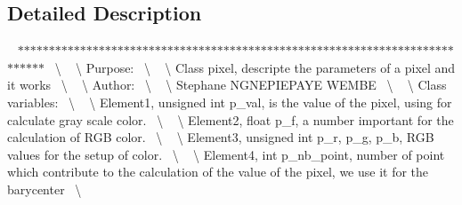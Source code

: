 \subsection{Detailed Description}
~\newline
$\ast$$\ast$$\ast$$\ast$$\ast$$\ast$$\ast$$\ast$$\ast$$\ast$$\ast$$\ast$$\ast$$\ast$$\ast$$\ast$$\ast$$\ast$$\ast$$\ast$$\ast$$\ast$$\ast$$\ast$$\ast$$\ast$$\ast$$\ast$$\ast$$\ast$$\ast$$\ast$$\ast$$\ast$$\ast$$\ast$$\ast$$\ast$$\ast$$\ast$$\ast$$\ast$$\ast$$\ast$$\ast$$\ast$$\ast$$\ast$$\ast$$\ast$$\ast$$\ast$$\ast$$\ast$$\ast$$\ast$$\ast$$\ast$$\ast$$\ast$$\ast$$\ast$$\ast$$\ast$$\ast$$\ast$$\ast$$\ast$$\ast$$\ast$$\ast$$\ast$$\ast$$\ast$$\ast$$\ast$~\newline
\textbackslash{} ~\newline
\textbackslash{} Purpose\+:~\newline
\textbackslash{} ~\newline
\textbackslash{} Class pixel, descripte the parameters of a pixel and it works~\newline
\textbackslash{} ~\newline
\textbackslash{} Author\+:~\newline
\textbackslash{} ~\newline
\textbackslash{} Stephane N\+G\+N\+E\+P\+I\+E\+P\+A\+YE W\+E\+M\+BE~\newline
\textbackslash{} ~\newline
\textbackslash{} Class variables\+:~\newline
\textbackslash{} ~\newline
\textbackslash{} Element1, unsigned int p\+\_\+val, is the value of the pixel, using for calculate gray scale color.~\newline
\textbackslash{} ~\newline
\textbackslash{} Element2, float p\+\_\+f, a number important for the calculation of R\+GB color.~\newline
\textbackslash{} ~\newline
\textbackslash{} Element3, unsigned int p\+\_\+r, p\+\_\+g, p\+\_\+b, R\+GB values for the setup of color.~\newline
\textbackslash{} ~\newline
\textbackslash{} Element4, int p\+\_\+nb\+\_\+point, number of point which contribute to the calculation of the value of the pixel, we use it for the barycenter~\newline
\textbackslash{} ~\newline


